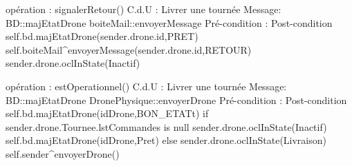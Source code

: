 opération : signalerRetour()
C.d.U : Livrer une tournée
Message:
BD::{majEtatDrone}
boiteMail::{envoyerMessage}  
Pré-condition : 
Post-condition 
        self.bd.majEtatDrone(sender.drone.id,PRET)
        self.boiteMail^envoyerMessage(sender.drone.id,RETOUR)
        sender.drone.oclInState(Inactif)




opération : estOperationnel()
C.d.U : Livrer une tournée
Message:
BD::{majEtatDrone} 
DronePhysique::{envoyerDrone}
Pré-condition : 
Post-condition 
        self.bd.majEtatDrone(idDrone,BON_ETATt)
        if sender.drone.Tournee.lstCommandes is null
                sender.drone.oclInState(Inactif)
                self.bd.majEtatDrone(idDrone,Pret)
        else
                sender.drone.oclInState(Livraison)
                self.sender^envoyerDrone()